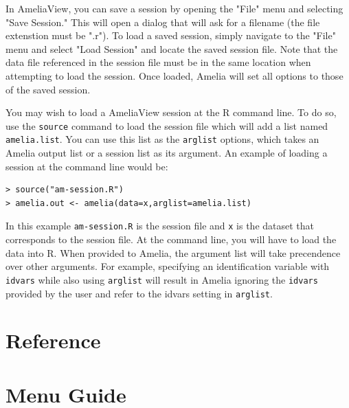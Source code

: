 \documentclass[12pt,titlepage]{article}
\begin{document}
In AmeliaView, you can save a session by opening the "File" menu and 
selecting "Save Session."  This will open a dialog that will ask for a 
filename (the file extenstion must be ".r").  To load a saved session,
simply navigate to the "File" menu and select "Load Session" and locate
the saved session file.  Note that the data file referenced in the session
file must be in the same location when attempting to load the session.
Once loaded, Amelia will set all options to those of the saved session.

You may wish to load a AmeliaView session at the R command line.  To do so,
use the \texttt{source} command to load the session file which will add
a list named \texttt{amelia.list}.  You can use this list as the 
\texttt{arglist} options,  which takes an Amelia output list or a session
list as its argument.  An example of loading a session at the command
line would be:

\begin{verbatim}
> source("am-session.R") 
> amelia.out <- amelia(data=x,arglist=amelia.list)
\end{verbatim}

In this example \texttt{am-session.R} is the session file and \texttt{x}
is the dataset that corresponds to the session file.  At the command line,
you will have to load the data into R.  When provided to Amelia, the 
argument list will take precendence over other arguments.  For example,
specifying an identification variable with \texttt{idvars} while also
using \texttt{arglist} will result in Amelia ignoring the \texttt{idvars}
provided by the user and refer to the idvars setting in \texttt{arglist}.


\section{Reference}
\label{sec:ref}

\section{Menu Guide}
\label{sec:menu}
\end{document}
